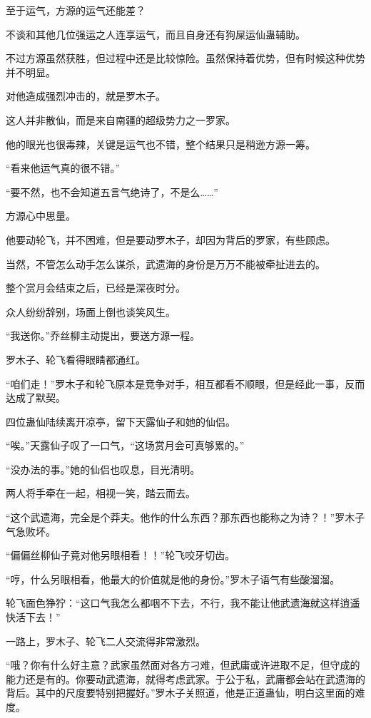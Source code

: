\begin{this_body}
至于运气，方源的运气还能差？

不谈和其他几位强运之人连享运气，而且自身还有狗屎运仙蛊辅助。

不过方源虽然获胜，但过程中还是比较惊险。虽然保持着优势，但有时候这种优势并不明显。

对他造成强烈冲击的，就是罗木子。

这人并非散仙，而是来自南疆的超级势力之一罗家。

他的眼光也很毒辣，关键是运气也不错，整个结果只是稍逊方源一筹。

“看来他运气真的很不错。”

“要不然，也不会知道五言气绝诗了，不是么……”

方源心中思量。

他要动轮飞，并不困难，但是要动罗木子，却因为背后的罗家，有些顾虑。

当然，不管怎么动手怎么谋杀，武遗海的身份是万万不能被牵扯进去的。

整个赏月会结束之后，已经是深夜时分。

众人纷纷辞别，场面上倒也谈笑风生。

“我送你。”乔丝柳主动提出，要送方源一程。

罗木子、轮飞看得眼睛都通红。

“咱们走！”罗木子和轮飞原本是竞争对手，相互都看不顺眼，但是经此一事，反而达成了默契。

四位蛊仙陆续离开凉亭，留下天露仙子和她的仙侣。

“唉。”天露仙子叹了一口气，“这场赏月会可真够累的。”

“没办法的事。”她的仙侣也叹息，目光清明。

两人将手牵在一起，相视一笑，踏云而去。

“这个武遗海，完全是个莽夫。他作的什么东西？那东西也能称之为诗？！”罗木子气急败坏。

“偏偏丝柳仙子竟对他另眼相看！！”轮飞咬牙切齿。

“哼，什么另眼相看，他最大的价值就是他的身份。”罗木子语气有些酸溜溜。

轮飞面色狰狞：“这口气我怎么都咽不下去，不行，我不能让他武遗海就这样逍遥快活下去！”

一路上，罗木子、轮飞二人交流得非常激烈。

“哦？你有什么好主意？武家虽然面对各方刁难，但武庸或许进取不足，但守成的能力还是有的。你要动武遗海，就得考虑武家。于公于私，武庸都会站在武遗海的背后。其中的尺度要特别把握好。”罗木子关照道，他是正道蛊仙，明白这里面的难度。


\end{this_body}
